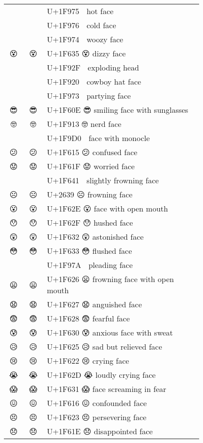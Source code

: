 \documentclass[a4paper,12pt]{ltjarticle}
\newcommand{\fontA}[1]{{\fontspec[RawFeature={mode=harf,dist,ccmp}]{Segoe UI Emoji} #1}}
\newcommand{\fontB}[1]{{\fontspec[RawFeature={mode=harf,dist,ccmp}]{Noto Color Emoji} #1}}
\begin{document}
\begin{longtable}[c]{ccp{0.8\linewidth}}
\fontA{🥵}&\fontB{🥵}&U+1F975 🥵 hot face\\
\fontA{🥶}&\fontB{🥶}&U+1F976 🥶 cold face\\
\fontA{🥴}&\fontB{🥴}&U+1F974 🥴 woozy face\\
\fontA{😵}&\fontB{😵}&U+1F635 😵 dizzy face\\
\fontA{🤯}&\fontB{🤯}&U+1F92F 🤯 exploding head\\
\fontA{🤠}&\fontB{🤠}&U+1F920 🤠 cowboy hat face\\
\fontA{🥳}&\fontB{🥳}&U+1F973 🥳 partying face\\
\fontA{😎}&\fontB{😎}&U+1F60E 😎 smiling face with sunglasses\\
\fontA{🤓}&\fontB{🤓}&U+1F913 🤓 nerd face\\
\fontA{🧐}&\fontB{🧐}&U+1F9D0 🧐 face with monocle\\
\fontA{😕}&\fontB{😕}&U+1F615 😕 confused face\\
\fontA{😟}&\fontB{😟}&U+1F61F 😟 worried face\\
\fontA{🙁}&\fontB{🙁}&U+1F641 🙁 slightly frowning face\\
\fontA{☹}&\fontB{☹}&U+2639 ☹ frowning face\\
\fontA{😮}&\fontB{😮}&U+1F62E 😮 face with open mouth\\
\fontA{😯}&\fontB{😯}&U+1F62F 😯 hushed face\\
\fontA{😲}&\fontB{😲}&U+1F632 😲 astonished face\\
\fontA{😳}&\fontB{😳}&U+1F633 😳 flushed face\\
\fontA{🥺}&\fontB{🥺}&U+1F97A 🥺 pleading face\\
\fontA{😦}&\fontB{😦}&U+1F626 😦 frowning face with open mouth\\
\fontA{😧}&\fontB{😧}&U+1F627 😧 anguished face\\
\fontA{😨}&\fontB{😨}&U+1F628 😨 fearful face\\
\fontA{😰}&\fontB{😰}&U+1F630 😰 anxious face with sweat\\
\fontA{😥}&\fontB{😥}&U+1F625 😥 sad but relieved face\\
\fontA{😢}&\fontB{😢}&U+1F622 😢 crying face\\
\fontA{😭}&\fontB{😭}&U+1F62D 😭 loudly crying face\\
\fontA{😱}&\fontB{😱}&U+1F631 😱 face screaming in fear\\
\fontA{😖}&\fontB{😖}&U+1F616 😖 confounded face\\
\fontA{😣}&\fontB{😣}&U+1F623 😣 persevering face\\
\fontA{😞}&\fontB{😞}&U+1F61E 😞 disappointed face\\

\end{longtable}
\end{document}
